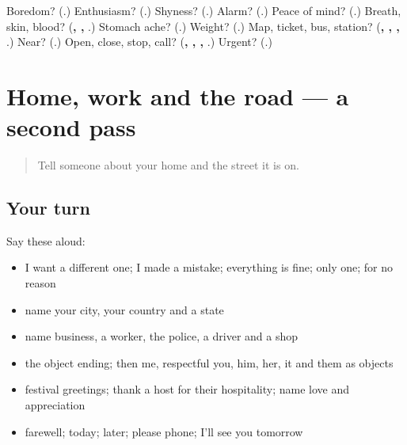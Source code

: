 \begin{tcolorbox}[breakable,colback=teal!4,colframe=teal!35!black,title={Before you move on}]
Boredom? (\textbf{}.) Enthusiasm? (\textbf{}.) Shyness? (\textbf{}.) Alarm? (\textbf{}.) Peace of mind? (\textbf{}.) Breath, skin, blood? (\textbf{, , }.) Stomach ache? (\textbf{}.) Weight? (\textbf{}.) Map, ticket, bus, station? (\textbf{, , , }.) Near? (\textbf{}.) Open, close, stop, call? (\textbf{, , , }.) Urgent? (\textbf{}.)
\end{tcolorbox}
\section[(dialogue)]{Home, work and the road — a second pass}

\label{lesson:KA-R106-second-pass-home-work-wishes}



\begin{quote}
Tell someone about your home and the street it is on.
\end{quote}

\subsection*{Your turn}
Say these aloud:

\begin{itemize}
\raggedright
  \item I want a different one; I made a mistake; everything is fine; only one; for no reason
  \item name your city, your country and a state
  \item name business, a worker, the police, a driver and a shop
  \item the object ending; then me, respectful you, him, her, it and them as objects
  \item festival greetings; thank a host for their hospitality; name love and appreciation
  \item farewell; today; later; please phone; I'll see you tomorrow
\end{itemize}

